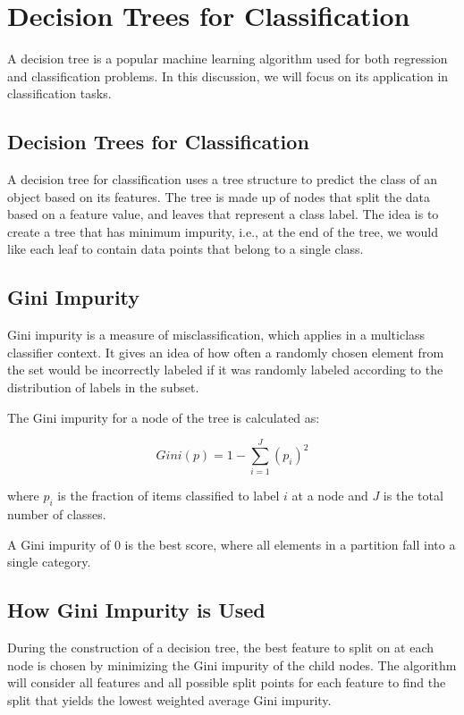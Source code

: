 \chapter{Decision Trees for Classification}

A decision tree is a popular machine learning algorithm used for both
regression and classification problems. In this discussion, we will
focus on its application in classification tasks.

\section{Decision Trees for Classification}

A decision tree for classification uses a tree structure to predict
the class of an object based on its features. The tree is made up of
nodes that split the data based on a feature value, and leaves that
represent a class label. The idea is to create a tree that has minimum
impurity, i.e., at the end of the tree, we would like each leaf to
contain data points that belong to a single class.

\section{Gini Impurity}

Gini impurity is a measure of misclassification, which applies in a
multiclass classifier context. It gives an idea of how often a
randomly chosen element from the set would be incorrectly labeled if
it was randomly labeled according to the distribution of labels in the
subset.

The Gini impurity for a node of the tree is calculated as:

\begin{equation}
Gini(p) = 1 - \sum_{i=1}^{J} (p_i)^2
\end{equation}

where $p_i$ is the fraction of items classified to label $i$ at a node and $J$ is the total number of classes.

A Gini impurity of 0 is the best score, where all elements in a partition fall into a single category. 

\section{How Gini Impurity is Used}

During the construction of a decision tree, the best feature to split on at each node is chosen by minimizing the Gini impurity of the child nodes. The algorithm will consider all features and all possible split points for each feature to find the split that yields the lowest weighted average Gini impurity.
